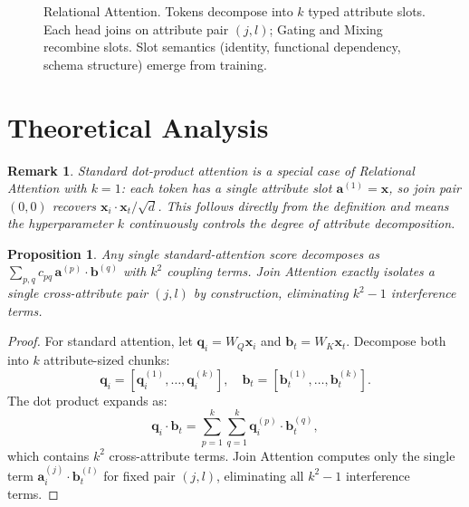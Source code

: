 \documentclass[conference]{IEEEtran}
\newtheorem{proposition}[theorem]{Proposition}
\newtheorem{remark}[theorem]{Remark}
\newcommand{\softmax}{\mathrm{softmax}}
\begin{document}
\begin{figure}[t]
\caption{Relational Attention. Tokens decompose into $k$ typed attribute slots. Each head joins on attribute pair $(j,l)$; Gating and Mixing recombine slots. Slot semantics (identity, functional dependency, schema structure) emerge from training.}
\label{fig:architecture}
\end{figure}

\section{Theoretical Analysis}
\label{sec:theory}

\begin{remark}
\label{rem:subsumption}
Standard dot-product attention is a special case of Relational Attention with $k=1$: each token has a single attribute slot $\mathbf{a}^{(1)} = \mathbf{x}$, so join pair $(0,0)$ recovers $\mathbf{x}_i \cdot \mathbf{x}_t / \sqrt{d}$. This follows directly from the definition and means the hyperparameter $k$ continuously controls the degree of attribute decomposition.
\end{remark}

\begin{proposition} \label{prop:interference}
Any single standard-attention score decomposes as $\sum_{p,q} c_{pq}\,\mathbf{a}^{(p)}\!\cdot\!\mathbf{b}^{(q)}$ with $k^2$ coupling terms. Join Attention exactly isolates a single cross-attribute pair $(j,l)$ by construction, eliminating $k^2-1$ interference terms.
\end{proposition}

\begin{proof}
	\renewcommand{\qedsymbol}{}
For standard attention, let $\mathbf{q}_i = W_Q \mathbf{x}_i$ and $\mathbf{b}_t = W_K \mathbf{x}_t$. Decompose both into $k$ attribute-sized chunks:
\[
\mathbf{q}_i = [\mathbf{q}_i^{(1)}, \ldots, \mathbf{q}_i^{(k)}], \quad \mathbf{b}_t = [\mathbf{b}_t^{(1)}, \ldots, \mathbf{b}_t^{(k)}].
\]
The dot product expands as:
\[
\mathbf{q}_i \cdot \mathbf{b}_t = \sum_{p=1}^{k} \sum_{q=1}^{k} \mathbf{q}_i^{(p)} \cdot \mathbf{b}_t^{(q)},
\]
which contains $k^2$ cross-attribute terms. Join Attention computes only the single term $\mathbf{a}_i^{(j)} \cdot \mathbf{b}_t^{(l)}$ for fixed pair $(j,l)$, eliminating all $k^2 - 1$ interference terms.
\end{proof}
\end{document}
